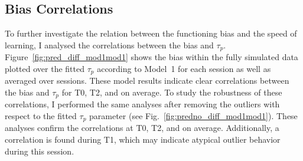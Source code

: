 \documentclass[a4paper]{scrreprt}
\begin{document}
\subsection{Bias Correlations}
\label{sec:learning_speed_bias_correlations}

To further investigate the relation between the functioning bias and the speed of learning, I analysed the correlations between the bias and $\tau_p$. Figure~\ref{fig:pred_diff_mod1mod1} shows the bias within the fully simulated data plotted over the fitted $\tau_p$ according to Model~1 for each session as well as averaged over sessions. These model results indicate clear correlations between the bias and $\tau_p$ for T0, T2, and on average. To study the robustness of these correlations, I performed the same analyses after removing the outliers with respect to the fitted $\tau_p$ parameter (see Fig.~\ref{fig:predno_diff_mod1mod1}). These analyses confirm the correlations at T0, T2, and on average.  Additionally, a correlation is found during T1, which may indicate atypical outlier behavior during this session.
\end{document}
